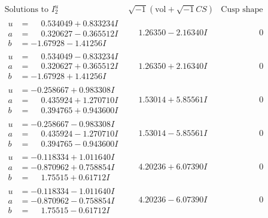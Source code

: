 \documentclass[1p]{elsarticle_modified}
\theoremstyle{definition}
\newcommand{\I}{\sqrt{-1}}
\begin{document}
$$\begin{array}{c|c|c}  
\text{Solutions to }I^u_{2}& \I (\text{vol} + \sqrt{-1}CS) & \text{Cusp shape}\\
 \hline 
\begin{aligned}
u &= \phantom{-}0.534049 + 0.833234 I \\
a &= \phantom{-}0.320627 - 0.365512 I \\
b &= -1.67928 - 1.41256 I\end{aligned}
 & \phantom{-}1.26350 - 2.16340 I & \phantom{-0.000000 } 0 \\ \hline\begin{aligned}
u &= \phantom{-}0.534049 - 0.833234 I \\
a &= \phantom{-}0.320627 + 0.365512 I \\
b &= -1.67928 + 1.41256 I\end{aligned}
 & \phantom{-}1.26350 + 2.16340 I & \phantom{-0.000000 } 0 \\ \hline\begin{aligned}
u &= -0.258667 + 0.983308 I \\
a &= \phantom{-}0.435924 + 1.270710 I \\
b &= \phantom{-}0.394765 + 0.943600 I\end{aligned}
 & \phantom{-}1.53014 + 5.85561 I & \phantom{-0.000000 } 0 \\ \hline\begin{aligned}
u &= -0.258667 - 0.983308 I \\
a &= \phantom{-}0.435924 - 1.270710 I \\
b &= \phantom{-}0.394765 - 0.943600 I\end{aligned}
 & \phantom{-}1.53014 - 5.85561 I & \phantom{-0.000000 } 0 \\ \hline\begin{aligned}
u &= -0.118334 + 1.011640 I \\
a &= -0.870962 + 0.758854 I \\
b &= \phantom{-}1.75515 + 0.61712 I\end{aligned}
 & \phantom{-}4.20236 + 6.07390 I & \phantom{-0.000000 } 0 \\ \hline\begin{aligned}
u &= -0.118334 - 1.011640 I \\
a &= -0.870962 - 0.758854 I \\
b &= \phantom{-}1.75515 - 0.61712 I\end{aligned}
 & \phantom{-}4.20236 - 6.07390 I & \phantom{-0.000000 } 0 \\ \hline\begin{aligned}

\end{aligned}
\end{array}$$
\end{document}
